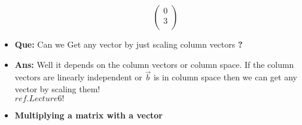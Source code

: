 \documentclass[a4paper,11pt]{article}
\numberwithin{equation}{section}
\begin{document}
\begin{itemize}
\begin{itemize}
\[\begin{pmatrix}
                                0\\
                                3\\
                            \end{pmatrix}
                            \]
            \end{itemize}
        \item \textbf{Que:} Can we Get any vector by just scaling column vectors \textbf{?}
        \item \textbf{Ans:} Well it depends on the column vectors or column space. If the column vectors are linearly independent or $\vec{b}$ is in column space then we can get any vector by scaling them! \\$ref. Lecture 6!$\\
    \item \textbf{Multiplying a matrix with a vector}\\
    
    \vspace{5pt}
    

\end{itemize}
\end{document}
